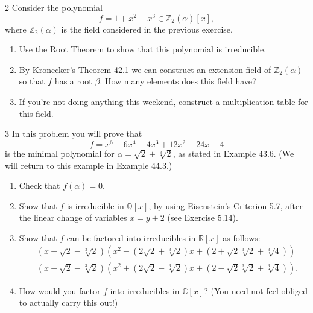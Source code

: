 \begin{problem}{2}
    Consider the polynomial
    \[f = 1 + x^2 + x^3 \in \mathbb{Z}_2(\alpha)[x],\]
    where $\mathbb{Z}_2(\alpha)$ is the field considered in the previous exercise.
    \begin{enumerate}
        \item[(a)] Use the Root Theorem to show that this polynomial is irreducible.
        \item[(b)] By Kronecker's Theorem 42.1 we can construct an extension field of
        $\mathbb{Z}_2(\alpha)$ so that $f$ has a root $\beta$. How many elements does this
        field have?
        \item[(c)] If you're not doing anything this weekend, construct a multiplication
        table for this field.
    \end{enumerate}
\end{problem}
\unsolved

\begin{problem}{3}
    In this problem you will prove that
    \[f = x^6 - 6x^4 - 4x^3 + 12x^2 - 24x - 4\]
    is the minimal polynomial for $\alpha = \sqrt{2} + \sqrt[3]{2}$, as stated in
    Example 43.6. (We will return to this example in Example 44.3.)
    \begin{enumerate}
        \item[(a)] Check that $f(\alpha) = 0$.
        \item[(b)] Show that $f$ is irreducible in $\mathbb{Q}[x]$, by using Eisenstein's
        Criterion 5.7, after the linear change of variables $x = y + 2$ (see
        Exercise 5.14).
        \item[(c)] Show that $f$ can be factored into irreducibles in $\mathbb{R}[x]$ as
        follows:
        \begin{align*}
            &\left(x - \sqrt{2} - \sqrt[3]{2}\right)
            \left(x^2 - (2\sqrt{2} + \sqrt[3]{2})x + (2 + \sqrt{2}\sqrt[3]{2} + \sqrt[3]{4})\right) \\
            &\left(x + \sqrt{2} - \sqrt[3]{2}\right)
            \left(x^2 + (2\sqrt{2} - \sqrt[3]{2})x + (2 - \sqrt{2}\sqrt[3]{2} + \sqrt[3]{4})\right).
        \end{align*}
        \item[(d)] How would you factor $f$ into irreducibles in $\mathbb{C}[x]$? (You need
        not feel obliged to actually carry this out!)
    \end{enumerate}
\end{problem}
\unsolved

